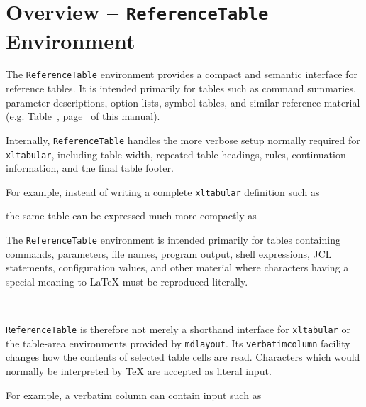 \documentclass[
11pt,
a4paper,
oneside
]{scrbook}
\begin{document}
\section{Overview -- \texttt{ReferenceTable} Environment}

The \texttt{ReferenceTable} environment provides a compact and semantic
interface for reference tables. It is intended primarily for tables such as
command summaries, parameter descriptions, option lists, symbol tables, and
similar reference material (e.g. Table~, 
page~ of this manual).

Internally, \texttt{ReferenceTable} handles the more verbose setup normally
required for \texttt{xltabular}, including table width, repeated table
headings, rules, continuation information, and the final table footer.

For example, instead of writing a complete \texttt{xltabular} definition such
as






\noindent
the same table can be expressed much more compactly as





The \texttt{ReferenceTable} environment is intended primarily for tables
containing commands, parameters, file names, program output, shell
expressions, JCL statements, configuration values, and other material where
characters having a special meaning to \LaTeX{} must be reproduced literally.

\begin{SynchronizedMarginAndTextArea}
	\begin{TextInMarginArea}
		{\centering\mdSeeRight\\}
	\end{TextInMarginArea}
	\begin{TextInTextArea}
		\texttt{ReferenceTable} is therefore not merely a shorthand interface
		for \texttt{xltabular} or the table-area environments provided by
		\texttt{mdlayout}. Its \texttt{verbatimcolumn} facility changes how
		the contents of selected table cells are read. Characters which would
		normally be interpreted by \TeX{} are accepted as literal input.
	\end{TextInTextArea}
\end{SynchronizedMarginAndTextArea}
For example, a verbatim column can contain input such as
\end{document}
